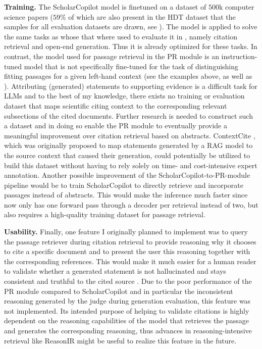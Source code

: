 \textbf{Training.} The ScholarCopilot model is finetuned on a dataset of $500$k computer science papers \cite{wang2025scholarcopilot} ($59\%$ of which are also present in the HDT dataset \cite{He2024HDT} that the samples for all evaluation datasets are drawn, see ). The model is applied to solve the same tasks as whose that where used to evaluate it in \cite{wang2025scholarcopilot}, namely citation retrieval and open-end generation. Thus it is already optimized for these tasks. In contrast, the model used for passage retrieval in the PR module is an instruction-tuned  model that is not specifically fine-tuned for the task of distinguishing fitting passages for a given left-hand context (see the examples above, as well as ). Attributing (generated) statements to supporting evidence is a difficult task for LLMs \cite{liu2023evaluating} and to the best of my knowledge, there exists no training or evaluation dataset that maps scientific citing context to the corresponding relevant subsections of the cited documents. Further research is needed to construct such a dataset and in doing so enable the PR module to eventually provide a meaningful improvement over citation retrieval based on abstracts. ContextCite \cite{cohen2024contextcite}, which was originally proposed to map statements generated by a RAG model to the source context that caused their generation, could potentially be utilized to build this dataset without having to rely solely on time- and cost-intensive expert annotation. Another possible improvement of the ScholarCopilot-to-PR-module pipeline would be to train ScholarCopilot to directly retrieve and incorporate passages instead of abstracts. This would make the inference much faster since now only has one forward pass through a decoder per retrieval instead of two, but also requires a high-quality training dataset for passage retrieval.

\textbf{Usability.} Finally, one feature I originally planned to implement was to query the passage retriever during citation retrieval to provide reasoning why it chooses to cite a specific document and to present the user this reasoning together with the corresponding references. This would make it much easier for a human reader to validate whether a generated statement is not hallucinated and stays consistent and truthful to the cited source \cite{ji2023survey}. Due to the poor performance of the PR module compared to ScholarCopilot and in particular the inconsistent reasoning generated by the judge during generation evaluation, this feature was not implemented. Its intended purpose of helping to validate citations is highly dependent on the reasoning capabilities of the model that retrieves the passage and generates the corresponding reasoning, thus advances in reasoning-intensive retrieval like ReasonIR \cite{shao2025reasonir} might be useful to realize this feature in the future. 

